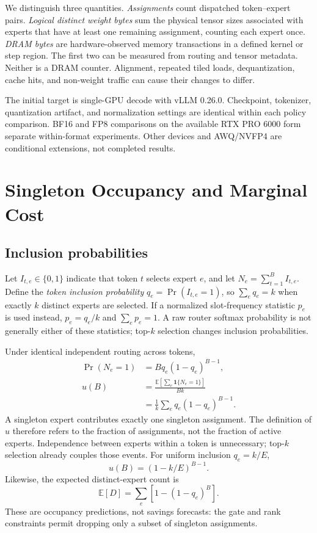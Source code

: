 \documentclass[10pt,twocolumn]{article}
\newcommand{\ind}{\mathbf{1}}
\begin{document}
We distinguish three quantities. \emph{Assignments} count dispatched token--expert pairs. \emph{Logical distinct weight bytes} sum the physical tensor sizes associated with experts that have at least one remaining assignment, counting each expert once. \emph{DRAM bytes} are hardware-observed memory transactions in a defined kernel or step region. The first two can be measured from routing and tensor metadata. Neither is a DRAM counter. Alignment, repeated tiled loads, dequantization, cache hits, and non-weight traffic can cause their changes to differ.

The initial target is single-GPU decode with vLLM 0.26.0. Checkpoint, tokenizer, quantization artifact, and normalization settings are identical within each policy comparison. BF16 and FP8 comparisons on the available RTX PRO 6000 form separate within-format experiments. Other devices and AWQ/NVFP4 are conditional extensions, not completed results.

\section{Singleton Occupancy and Marginal Cost}
\subsection{Inclusion probabilities}
Let $I_{t,e}\in\{0,1\}$ indicate that token $t$ selects expert $e$, and let $N_e=\sum_{t=1}^{B}I_{t,e}$. Define the \emph{token inclusion probability} $q_e=\Pr(I_{t,e}=1)$, so $\sum_e q_e=k$ when exactly $k$ distinct experts are selected. If a normalized slot-frequency statistic $p_e$ is used instead, $p_e=q_e/k$ and $\sum_e p_e=1$. A raw router softmax probability is not generally either of these statistics; top-$k$ selection changes inclusion probabilities.

Under identical independent routing across tokens,
\begin{align}
\Pr(N_e=1)&=Bq_e(1-q_e)^{B-1},\\
u(B)&=\frac{\mathbb{E}[\sum_e\ind\{N_e=1\}]}{Bk}\nonumber\\
&=\frac{1}{k}\sum_e q_e(1-q_e)^{B-1}.\label{eq:singleton}
\end{align}
A singleton expert contributes exactly one singleton assignment. The definition of $u$ therefore refers to the fraction of assignments, not the fraction of active experts. Independence between experts within a token is unnecessary; top-$k$ selection already couples those events. For uniform inclusion $q_e=k/E$,
\begin{equation}
u(B)=(1-k/E)^{B-1}.\label{eq:uniform}
\end{equation}
Likewise, the expected distinct-expert count is
\begin{equation}
\mathbb{E}[D]=\sum_e[1-(1-q_e)^B].
\end{equation}
These are occupancy predictions, not savings forecasts: the gate and rank constraints permit dropping only a subset of singleton assignments.
\end{document}
